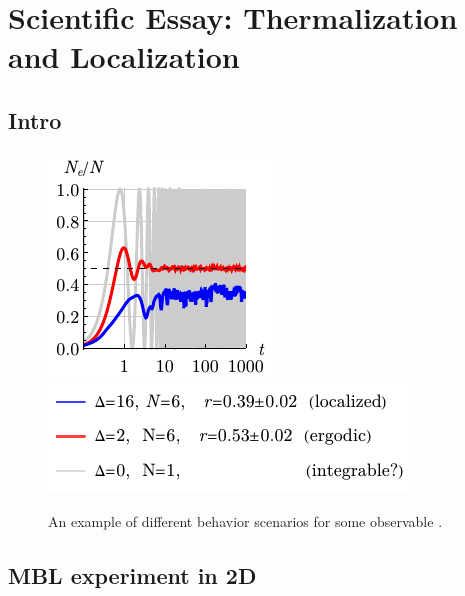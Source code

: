 \setcounter{section}{8}
\setcounter{subsection}{0}


\section{Scientific Essay: Thermalization and Localization}




\subsection{Intro}




\begin{figure}[h]
    \centering
    \hspace{10 mm} 
    \includegraphics[align=c]{imgs/lo2.pdf}
    \hspace{1 mm} 
    \includegraphics[align=c]{imgs/lo2l.pdf}
    \caption{
    An example of different behavior scenarios for some observable
    .
    }
    \label{fig:BASE}
\end{figure}








\subsection{MBL experiment in 2D}

